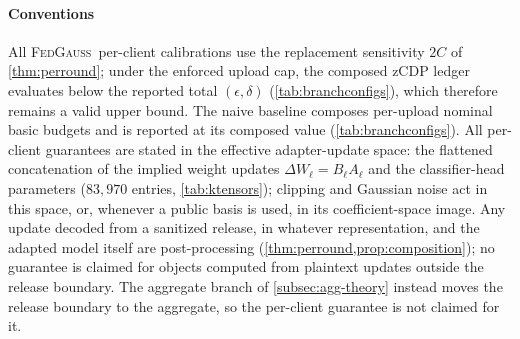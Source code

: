 \documentclass[a4paper,fleqn]{cas-dc}
\newcommand{\method}{\textsc{FedGauss}}
\begin{document}
\paragraph{Conventions}
All \method\ per-client calibrations use the replacement sensitivity $2C$ of
\cref{thm:perround}; under the enforced upload cap, the composed
zCDP ledger evaluates below the reported total $(\epsilon,\delta)$
(\cref{tab:branchconfigs}), which
therefore remains a valid upper bound. The naive baseline composes per-upload
nominal basic budgets and is reported at its composed value
(\cref{tab:branchconfigs}). All per-client guarantees are stated
in the effective adapter-update space: the flattened concatenation of the
implied weight updates $\Delta W_\ell=B_\ell A_\ell$ and the
classifier-head parameters ($83{,}970$ entries,
\cref{tab:ktensors}); clipping and Gaussian noise act
in this space, or, whenever a public basis is used, in its coefficient-space
image. Any update decoded from a sanitized release, in whatever
representation, and the adapted model itself are post-processing
(\cref{thm:perround,prop:composition}); no guarantee
is claimed for objects computed from plaintext updates outside the release
boundary. The aggregate branch of \cref{subsec:agg-theory} instead
moves the release boundary to the aggregate, so the per-client guarantee is
not claimed for it.
\par
\end{document}
